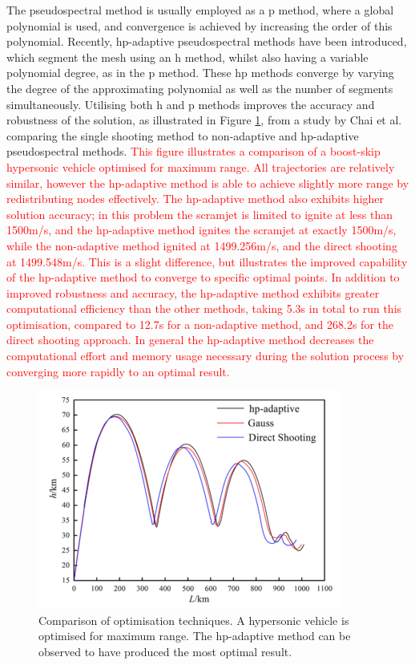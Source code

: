 The pseudospectral method is usually employed as a \textsf{p} method, where a global polynomial is used, and convergence is achieved by increasing the order of this polynomial\cite{Rao2009}. Recently, \textsf{hp}-adaptive pseudospectral methods have been introduced, which segment the mesh using an h method, whilst also having a variable polynomial degree, as in the \textsf{p} method\cite{Darby2011a}. These \textsf{hp} methods converge by varying the degree of the approximating polynomial as well as the number of segments simultaneously. Utilising both \textsf{h} and \textsf{p} methods improves the accuracy and robustness of the solution, as illustrated in Figure \ref{fig:OptimisationMethodComparisonChai}, from a study by Chai et al.\cite{Chai2015} comparing the single shooting method to non-adaptive and \textsf{hp}-adaptive pseudospectral methods. \textcolor{red}{This figure illustrates a comparison of a boost-skip hypersonic vehicle optimised for maximum range. All trajectories are relatively similar, however the \textsf{hp}-adaptive method is able to achieve slightly more range by redistributing nodes effectively. The \textsf{hp}-adaptive method also exhibits higher solution accuracy; in this problem the scramjet is limited to ignite at less than 1500m/s, and the \textsf{hp}-adaptive method ignites the scramjet at exactly 1500m/s, while the non-adaptive method ignited at 1499.256m/s, and the direct shooting at 1499.548m/s. This is a slight difference, but illustrates the improved capability of the \textsf{hp}-adaptive method to converge to specific optimal points. In addition to improved robustness and accuracy, the \textsf{hp}-adaptive method exhibits greater computational efficiency than the other methods, taking 5.3s in total to run this optimisation, compared to 12.7s for a non-adaptive method, and 268.2s for the direct shooting approach. In general the \textsf{hp}-adaptive method decreases the computational effort and memory usage necessary during the solution process by converging more rapidly to an optimal result\cite{Darby2011a,Chai2015}. }


\begin{figure}[ht]
	\centering
	\includegraphics[width=0.7\linewidth]{figures/2_literature-review/OptimisationMethodComparisonChai}
	\caption{Comparison of optimisation techniques\cite{Chai2015}. A hypersonic vehicle is optimised for maximum range. The \textsf{hp}-adaptive method can be observed to have produced the most optimal result.}
	\label{fig:OptimisationMethodComparisonChai}
\end{figure}

